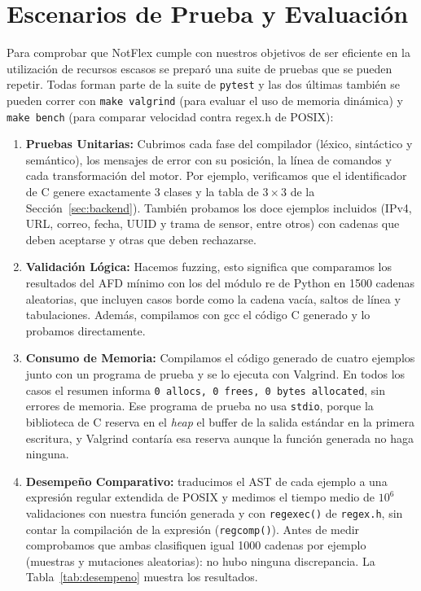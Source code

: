\documentclass[runningheads]{llncs}
\begin{document}
\section{Escenarios de Prueba y Evaluación} \label{sec:pruebas}
Para comprobar que NotFlex cumple con nuestros objetivos de ser eficiente en la utilización de recursos escasos se preparó una suite de pruebas que se pueden repetir. Todas forman parte de la suite de \texttt{pytest} y las dos últimas también se pueden correr con \texttt{make valgrind} (para evaluar el uso de memoria dinámica) y \texttt{make bench} (para comparar velocidad contra regex.h de POSIX):
\begin{enumerate}
  \item \textbf{Pruebas Unitarias:} Cubrimos cada fase del compilador (léxico, sintáctico y semántico), los mensajes de error con su posición, la línea de comandos y cada transformación del motor. Por ejemplo, verificamos que el identificador de C genere exactamente 3 clases y la tabla de  $3 \times 3$  de la Sección~\ref{sec:backend}). También probamos los doce ejemplos incluidos (IPv4, URL, correo, fecha, UUID y trama de sensor, entre otros) con cadenas que deben aceptarse y otras que deben rechazarse.
  \item \textbf{Validación Lógica:} Hacemos fuzzing, esto significa que comparamos los resultados del AFD mínimo con los del módulo re de Python en 1500 cadenas aleatorias, que incluyen casos borde como la cadena vacía, saltos de línea y tabulaciones. Además, compilamos con gcc el código C generado y lo probamos directamente.
  \item \textbf{Consumo de Memoria:} Compilamos el código generado de cuatro ejemplos junto con un programa de prueba y se lo ejecuta con Valgrind. En todos los casos el resumen informa \texttt{0 allocs, 0 frees, 0 bytes allocated}, sin errores de memoria. Ese programa de prueba no usa \texttt{stdio}, porque la biblioteca de C reserva en el \emph{heap} el buffer de la salida estándar en la primera escritura, y Valgrind contaría esa reserva aunque la función generada no haga ninguna.
  \item \textbf{Desempeño Comparativo:} traducimos el AST de cada ejemplo a una expresión regular extendida de POSIX y medimos el tiempo medio de $10^6$ validaciones con nuestra función generada y con \texttt{regexec()} de \texttt{regex.h}, sin contar la compilación de la expresión (\texttt{regcomp()}). Antes de medir comprobamos que ambas clasifiquen igual 1000 cadenas por ejemplo (muestras y mutaciones aleatorias): no hubo ninguna discrepancia. La Tabla~\ref{tab:desempeno} muestra los resultados.
\end{enumerate}
\end{document}
